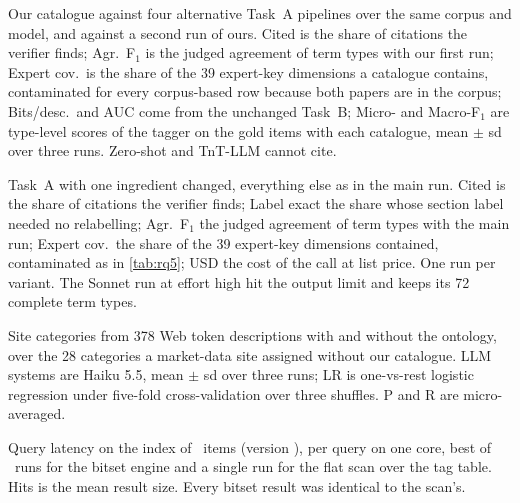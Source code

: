 \begin{table}[t]
  \centering
  \caption{Our catalogue against four alternative Task~A pipelines over the
  same corpus and model, and against a second run of ours. Cited is the share
  of citations the verifier finds; Agr.\ F$_1$ is the judged agreement of
  term types with our first run; Expert cov.\ is the share of the 39
  expert-key dimensions a catalogue contains, contaminated for every
  corpus-based row because both papers are in the corpus; Bits/desc.\ and
  AUC come from the unchanged Task~B; Micro- and Macro-F$_1$ are type-level
  scores of the tagger on the gold items with each catalogue, mean $\pm$ sd
  over three runs. Zero-shot and TnT-LLM cannot cite.}
  \label{tab:rq5}
  \scriptsize
  
\end{table}

\begin{table}[t]
  \centering
  \caption{Task~A with one ingredient changed, everything else as in the main
  run. Cited is the share of citations the verifier finds; Label exact the
  share whose section label needed no relabelling; Agr.\ F$_1$ the judged
  agreement of term types with the main run; Expert cov.\ the share of the 39
  expert-key dimensions contained, contaminated as in \cref{tab:rq5}; USD the
  cost of the call at list price. One run per variant. The Sonnet run at
  effort high hit the output limit and keeps its 72 complete term types.}
    \label{tab:rq6}
  \scriptsize
  
\end{table}

\begin{table}[t]
  \centering
  \caption{Site categories from 378 Web token descriptions with and without
  the ontology, over the 28 categories a market-data site assigned without
  our catalogue. LLM systems are Haiku 5.5, mean $\pm$ sd over three runs;
  LR is one-vs-rest logistic regression under five-fold cross-validation
  over three shuffles. P and R are micro-averaged.}
  \label{tab:rq7}
  \scriptsize
  
\end{table}

\begin{table}[t]
  \centering
  \caption{Query latency on the index of \RItems\ items (version \RCat), per
  query on one core, best of \RRepeat\ runs for the bitset engine and a single
  run for the flat scan over the tag table. Hits is the mean result size.
  Every bitset result was identical to the scan's.}
  \label{tab:retrieval}
  \scriptsize
  
\end{table}

